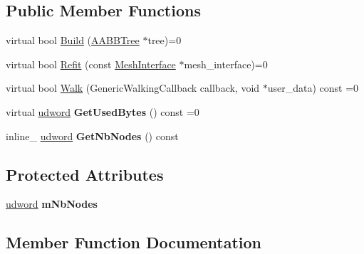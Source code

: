 \subsection*{Public Member Functions}
\begin{DoxyCompactItemize}
\item 
virtual bool \hyperlink{classAABBOptimizedTree_acbe22cc880be2a05232bd84efb029e37}{Build} (\hyperlink{classAABBTree}{A\+A\+B\+B\+Tree} $\ast$tree)=0
\item 
virtual bool \hyperlink{classAABBOptimizedTree_a306eaa4c045e8549937df133dfe94e12}{Refit} (const \hyperlink{classMeshInterface}{Mesh\+Interface} $\ast$mesh\+\_\+interface)=0
\item 
virtual bool \hyperlink{classAABBOptimizedTree_addc2788f0391992e359ee76cf87923de}{Walk} (Generic\+Walking\+Callback callback, void $\ast$user\+\_\+data) const =0
\item 
virtual \hyperlink{IceTypes_8h_a44c6f1920ba5551225fb534f9d1a1733}{udword} {\bfseries Get\+Used\+Bytes} () const =0\hypertarget{classAABBOptimizedTree_a167d786413b470a0a5970c95a78feaf5}{}\label{classAABBOptimizedTree_a167d786413b470a0a5970c95a78feaf5}

\item 
inline\+\_\+ \hyperlink{IceTypes_8h_a44c6f1920ba5551225fb534f9d1a1733}{udword} {\bfseries Get\+Nb\+Nodes} () const \hypertarget{classAABBOptimizedTree_a0b37c6e0b222dd0f2b776b81cdc43c93}{}\label{classAABBOptimizedTree_a0b37c6e0b222dd0f2b776b81cdc43c93}

\end{DoxyCompactItemize}
\subsection*{Protected Attributes}
\begin{DoxyCompactItemize}
\item 
\hyperlink{IceTypes_8h_a44c6f1920ba5551225fb534f9d1a1733}{udword} {\bfseries m\+Nb\+Nodes}\hypertarget{classAABBOptimizedTree_a808983c59c9aa9fb9efefec356bdf13d}{}\label{classAABBOptimizedTree_a808983c59c9aa9fb9efefec356bdf13d}

\end{DoxyCompactItemize}


\subsection{Member Function Documentation}
